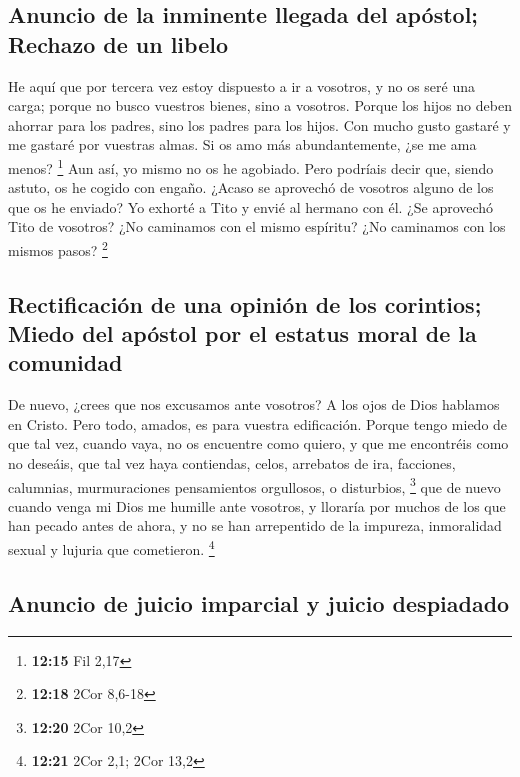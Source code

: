 \hypertarget{anuncio-de-la-inminente-llegada-del-apuxf3stol-rechazo-de-un-libelo}{%
\subsection{Anuncio de la inminente llegada del apóstol; Rechazo de un
libelo}\label{anuncio-de-la-inminente-llegada-del-apuxf3stol-rechazo-de-un-libelo}}

 He aquí que por tercera vez estoy dispuesto a ir a
vosotros, y no os seré una carga; porque no busco vuestros bienes, sino
a vosotros. Porque los hijos no deben ahorrar para los padres, sino los
padres para los hijos.  Con mucho gusto gastaré y me
gastaré por vuestras almas. Si os amo más abundantemente, ¿se me ama
menos? \footnote{\textbf{12:15} Fil 2,17}  Aun así, yo
mismo no os he agobiado. Pero podríais decir que, siendo astuto, os he
cogido con engaño.  ¿Acaso se aprovechó de vosotros
alguno de los que os he enviado?  Yo exhorté a Tito y
envié al hermano con él. ¿Se aprovechó Tito de vosotros? ¿No caminamos
con el mismo espíritu? ¿No caminamos con los mismos pasos? \footnote{\textbf{12:18}
  2Cor 8,6-18}

\hypertarget{rectificaciuxf3n-de-una-opiniuxf3n-de-los-corintios-miedo-del-apuxf3stol-por-el-estatus-moral-de-la-comunidad}{%
\subsection{Rectificación de una opinión de los corintios; Miedo del
apóstol por el estatus moral de la
comunidad}\label{rectificaciuxf3n-de-una-opiniuxf3n-de-los-corintios-miedo-del-apuxf3stol-por-el-estatus-moral-de-la-comunidad}}

 De nuevo, ¿crees que nos excusamos ante vosotros? A los
ojos de Dios hablamos en Cristo. Pero todo, amados, es para vuestra
edificación.  Porque tengo miedo de que tal vez, cuando
vaya, no os encuentre como quiero, y que me encontréis como no deseáis,
que tal vez haya contiendas, celos, arrebatos de ira, facciones,
calumnias, murmuraciones pensamientos orgullosos, o disturbios,
\footnote{\textbf{12:20} 2Cor 10,2}  que de nuevo cuando
venga mi Dios me humille ante vosotros, y lloraría por muchos de los que
han pecado antes de ahora, y no se han arrepentido de la impureza,
inmoralidad sexual y lujuria que cometieron. \footnote{\textbf{12:21}
  2Cor 2,1; 2Cor 13,2}

\hypertarget{anuncio-de-juicio-imparcial-y-juicio-despiadado}{%
\subsection{Anuncio de juicio imparcial y juicio
despiadado}\label{anuncio-de-juicio-imparcial-y-juicio-despiadado}}

